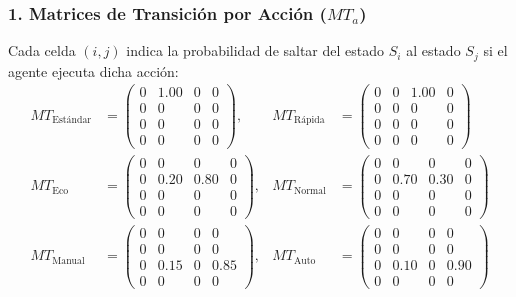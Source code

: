 \subsubsection*{1. Matrices de Transición por Acción ($MT_a$)}
Cada celda $(i, j)$ indica la probabilidad de saltar del estado $S_i$ al estado $S_j$ si el agente ejecuta dicha acción:
\begin{align*}
  MT_{\text{Estándar}} &= \begin{pmatrix}
    0 & 1.00 & 0 & 0 \\
    0 & 0 & 0 & 0 \\
    0 & 0 & 0 & 0 \\
    0 & 0 & 0 & 0
  \end{pmatrix}, &
  MT_{\text{Rápida}} &= \begin{pmatrix}
    0 & 0 & 1.00 & 0 \\
    0 & 0 & 0 & 0 \\
    0 & 0 & 0 & 0 \\
    0 & 0 & 0 & 0
  \end{pmatrix} \\[6pt]
  MT_{\text{Eco}} &= \begin{pmatrix}
    0 & 0 & 0 & 0 \\
    0 & 0.20 & 0.80 & 0 \\
    0 & 0 & 0 & 0 \\
    0 & 0 & 0 & 0
  \end{pmatrix}, &
  MT_{\text{Normal}} &= \begin{pmatrix}
    0 & 0 & 0 & 0 \\
    0 & 0.70 & 0.30 & 0 \\
    0 & 0 & 0 & 0 \\
    0 & 0 & 0 & 0
  \end{pmatrix} \\[6pt]
  MT_{\text{Manual}} &= \begin{pmatrix}
    0 & 0 & 0 & 0 \\
    0 & 0 & 0 & 0 \\
    0 & 0.15 & 0 & 0.85 \\
    0 & 0 & 0 & 0
  \end{pmatrix}, &
  MT_{\text{Auto}} &= \begin{pmatrix}
    0 & 0 & 0 & 0 \\
    0 & 0 & 0 & 0 \\
    0 & 0.10 & 0 & 0.90 \\
    0 & 0 & 0 & 0
  \end{pmatrix}
\end{align*}


